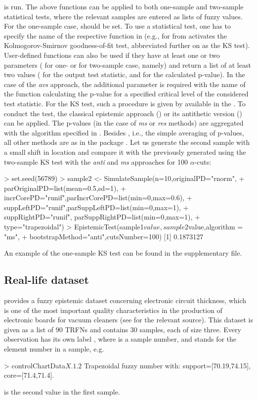 is run.
The above functions can be applied to both one-sample and two-sample statistical tests, where the relevant samples are entered as lists of fuzzy values.
For the one-sample case,  should be set.
To use a statistical test, one has to specify the name of the respective function in  (e.g.,  for  from  activates the Kolmogorov-Smirnov goodness-of-fit test, abbreviated further on as the KS test).
User-defined functions can also be used if they have at least one or two parameters ( for one- or  for two-sample case, namely) and return a list of at least two values ( for the output test statistic, and  for the calculated p-value).
In the case of the \emph{avs} approach, the additional parameter  is required with the name of the function  calculating the p-value for a specified critical level of the considered test statistic.
For the KS test, such a procedure is given by  available in the .
To conduct the test, the classical epistemic approach () or its antithetic version () can be applied.
The p-values (in the case of \emph{ms} or \emph{res} methods) are aggregated with the algorithm specified in .
Besides , i.e., the simple averaging of p-values, all other methods are as in the package  \citep{palassoArt}.
Let us generate the second sample with a small shift in location and compare it with the previously generated  using the two-sample KS test with the \emph{anti} and \emph{ms} approaches for 100 $\alpha$-cuts:
\begin{example}
> set.seed(56789)
> sample2 <- SimulateSample(n=10,originalPD="rnorm",
+  parOriginalPD=list(mean=0.5,sd=1),
+  incrCorePD="runif",parIncrCorePD=list(min=0,max=0.6),
+  suppLeftPD="runif",parSuppLeftPD=list(min=0,max=1),
+  suppRightPD="runif", parSuppRightPD=list(min=0,max=1),
+  type="trapezoidal")
> EpistemicTest(sample1$value,sample2$value,algorithm = "ms",
+  bootstrapMethod="anti",cutsNumber=100)
[1] 0.1873127
\end{example}
An example of the one-sample KS test can be found in the supplementary file. 
\subsection{Real-life dataset}
 provides a fuzzy epistemic dataset  concerning electronic circuit thickness, which is one of the most important quality characteristics in the production of electronic boards for vacuum cleaners (see \cite{FARAZ20102684} for the relevant source).
This dataset is given as a list of 90 TRFNs and contains 30 samples, each of size three.
Every observation has its own label , where  is a sample number, and  stands for the element number in a sample, e.g.
\begin{example}
> controlChartData$X.1.2$
Trapezoidal fuzzy number with:
   support=[70.19,74.15],
   core=[71.4,71.4].
\end{example}
is the second value in the first sample.

